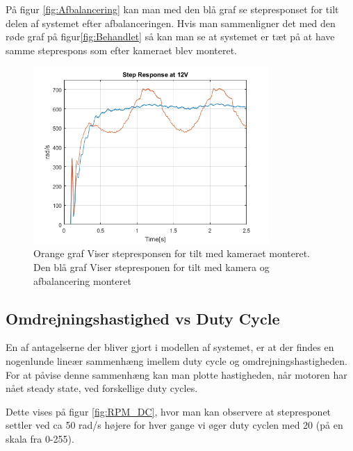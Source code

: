På figur \ref{fig:Afbalancering} kan man med den blå graf se stepresponset for tilt delen af systemet efter afbalanceringen. Hvis man sammenligner det med den røde graf på figur\ref{fig:Behandlet} så kan man se at systemet er tæt på at have samme steprespons som efter kameraet blev monteret.\\


\begin{figure}[ht]
	\begin{center}
		\includegraphics[width=0.8\textwidth]{Billeder/balanced_vs_unbalanced.png}
	\end{center}
	\caption{Orange graf Viser stepresponsen for tilt med kameraet monteret. Den blå graf Viser stepresponen for tilt med kamera og afbalancering monteret}
	\label{fig:Balanced_Response}
\end{figure}

\subsection{Omdrejningshastighed vs Duty Cycle}

En af antagelserne der bliver gjort i modellen af systemet, er at der findes en nogenlunde lineær sammenhæng imellem duty cycle og omdrejningshastigheden. For at påvise denne sammenhæng kan man plotte hastigheden, når motoren har nået steady state, ved forskellige duty cycles. 

Dette vises på figur \ref{fig:RPM_DC}, hvor man kan observere at stepresponet settler ved ca 50 rad/s højere for hver gange vi øger duty cyclen med 20 (på en skala fra 0-255).

